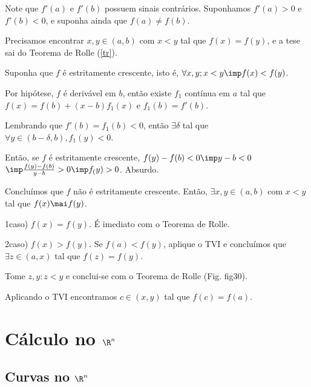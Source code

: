 \documentclass[11pt, oneside, a4paper]{gsm-l}
\begin{document}
\begin{sol}
Note que $f'(a)$ e $f'(b)$ possuem sinais contrários. Suponhamos $f'(a) > 0$ e $f'(b) < 0$, e suponha ainda que $f(a) \ne f(b)$.

\begin{figure}[!h]
  \centering
  \subfloat[fig29]{
    
    \label{fig29}
  }
  \quad
  \subfloat[fig30]{
    
    \label{fig30}
  }
\end{figure}

Precisamos encontrar $x,y \in (a,b)$ com $x < y$ tal que $f(x) = f(y)$, e a tese sai do Teorema de Rolle (\ref{tr}).

Suponha que $f$ é estritamente crescente, isto é, $\forall x,y; x < y \imp f(x) < f(y)$.

\begin{sloppypar}
Por hip\'otese, $f$ é derivável em $b$, então existe $f_1$ contínua em $a$ tal que ${f(x) = f(b) + (x - b)f_1(x)}$ e $f_1(b) = f'(b)$.
\end{sloppypar}

Lembrando que $f'(b) = f_1(b) < 0$, então $\exists \delta$ tal que $\forall y \in (b - \delta,b), f_1(y) < 0$.

Então, se $f$ é estritamente crescente, $f(y) - f(b) < 0 \imp y - b < 0$ \\
$\imp \frac{f(y) - f(b)}{y - b} > 0 \imp f_(y) > 0$. Absurdo.

Concluímos que $f$ não é estritamente crescente. Então, $\exists x,y \in (a,b)$ com $x < y$ tal que $f(x) \mai f(y)$.

1\textordmasculine caso) $f(x) = f(y)$. É imediato com o Teorema de Rolle.

2\textordmasculine caso) $f(x) > f(y)$. Se $f(a) < f(y)$, aplique o TVI e concluímos que $\exists z \in (a,x)$ tal que $f(z) = f(y)$.

Tome $z,y: z < y$ e conclui-se com o Teorema de Rolle (Fig. fig30).

Aplicando o TVI encontramos $c \in (x,y)$ tal que $f(c) = f(a)$.

\end{sol}





\chapter{Cálculo no $\R^n$} \label{chap02}

\section{Curvas no $\R^n$} \label{sec07}
\end{document}
